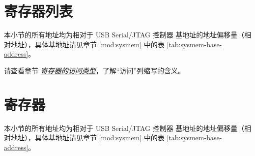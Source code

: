 \documentclass[main\_\_CN.tex]{subfiles}
\begin{document}

\clearpage
\section{寄存器列表}
\label{sec:usbserialjtag-reg-summ}
\hypertarget{usbserialjtag-reg-summ}{}

本小节的所有地址均为相对于 USB Serial/JTAG 控制器 基地址的地址偏移量（相对地址），具体基地址请见章节 \ref{mod:sysmem} \textit{} 中的表 \ref{tab:sysmem-base-address}。

请查看章节 \hyperref[glossary-access-types]{\textit{寄存器的访问类型}}，了解“访问”列缩写的含义。






\clearpage
\section{寄存器}

本小节的所有地址均为相对于 USB Serial/JTAG 控制器 基地址的地址偏移量（相对地址），具体基地址请见章节 \ref{mod:sysmem} \textit{} 中的表 \ref{tab:sysmem-base-address}。


\end{document}
